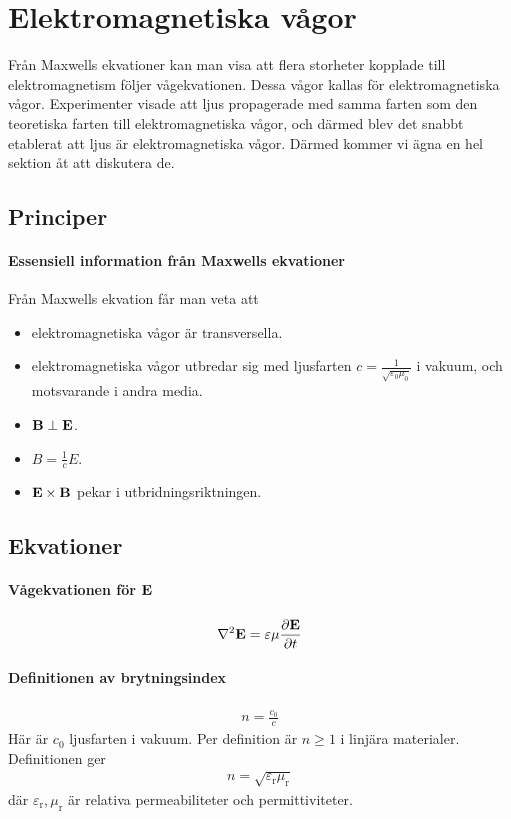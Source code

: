 \section{Elektromagnetiska vågor}
Från Maxwells ekvationer kan man visa att flera storheter kopplade till elektromagnetism följer vågekvationen. Dessa vågor kallas för elektromagnetiska vågor. Experimenter visade att ljus propagerade med samma farten som den teoretiska farten till elektromagnetiska vågor, och därmed blev det snabbt etablerat att ljus är elektromagnetiska vågor. Därmed kommer vi ägna en hel sektion åt att diskutera de.

\subsection{Principer}

\paragraph{Essensiell information från Maxwells ekvationer}
Från Maxwells ekvation får man veta att
\begin{itemize}
	\item elektromagnetiska vågor är transversella.
	\item elektromagnetiska vågor utbredar sig med ljusfarten $c = \frac{1}{\sqrt{\varepsilon_0\mu_0}}$ i vakuum, och motsvarande i andra media.
	\item $\vect{B}\perp\vect{E}$.
	\item $B = \frac{1}{c}E$.
	\item $\vect{E}\times\vect{B}$ pekar i utbridningsriktningen.
\end{itemize}

\subsection{Ekvationer}

\paragraph{Vågekvationen för $\vect{E}$}
\begin{align*}
	\laplacian{\vect{E}} = \varepsilon\mu\pdv{\vect{E}}{t}
\end{align*}

\deriv

\paragraph{Definitionen av brytningsindex}
\begin{align*}
	n = \frac{c_0}{c}
\end{align*}
Här är $c_0$ ljusfarten i vakuum. Per definition är $n\geq 1$ i linjära materialer. Definitionen ger
\begin{align*}
	n = \sqrt{\varepsilon_{\text{r}}\mu_{\text{r}}}
\end{align*}
där $\varepsilon_{\text{r}}, \mu_{\text{r}}$ är relativa permeabiliteter och permittiviteter.

